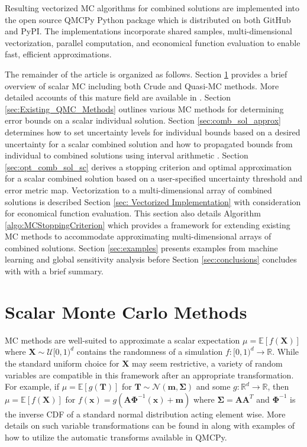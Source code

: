 \documentclass[graybox]{svmult}
\begin{document}
Resulting vectorized MC algorithms for combined solutions are implemented into the open source QMCPy Python package \cite{QMCPy} which is distributed on both GitHub and PyPI. The implementations incorporate shared samples, multi-dimensional vectorization, parallel computation, and economical function evaluation to enable fast, efficient approximations.

The remainder of the article is organized as follows. Section \ref{sec:MCM} provides a brief overview of scalar MC including both Crude and Quasi-MC methods. More detailed accounts of this mature field are available in \cite{niederreiter1992random,mcbook}. Section \ref{sec:Existing_QMC_Methods} outlines various MC methods for determining error bounds on a scalar individual solution. Section \ref{sec:comb_sol_approx} determines how to set uncertainty levels for individual bounds based on a desired uncertainty for a scalar combined solution and how to propagated bounds from individual to combined solutions using interval arithmetic \cite{interval_analysis}. Section \ref{sec:opt_comb_sol_sc} derives a stopping criterion and optimal approximation for a scalar combined solution based on a user-specified uncertainty threshold and error metric map. Vectorization to a multi-dimensional array of combined solutions is described Section \ref{sec: Vectorized Implementation} with consideration for economical function evaluation. This section also details Algorithm \ref{algo:MCStoppingCriterion} which provides a framework for extending existing MC methods to accommodate approximating multi-dimensional arrays of combined solutions. Section \ref{sec:examples} presents examples from machine learning and global sensitivity analysis before Section \ref{sec:conclusions} concludes with with a brief summary.   

\section{Scalar Monte Carlo Methods} \label{sec:MCM}

MC methods are well-suited to approximate a scalar expectation $\mu = \mathbb{E}[f(\boldsymbol{X})]$ where $\boldsymbol{X} \sim \mathcal{U}[0,1)^d$ contains the randomness of a simulation $f: [0,1)^{d} \to \mathbb{R}$. While the standard uniform choice for $\boldsymbol{X}$ may seem restrictive, a variety of random variables are compatible in this framework after an appropriate transformation. For example, if $\mu = \mathbb{E}[g(\boldsymbol{T})]$ for $\boldsymbol{T} \sim \mathcal{N}(\boldsymbol{m},\boldsymbol{\Sigma})$ and some $g: \mathbb{R}^{d} \to \mathbb{R}$, then $\mu = \mathbb{E}[f(\boldsymbol{X})]$ for  $f(\boldsymbol{x})=g(\boldsymbol{A}\boldsymbol{\Phi}^{-1}(\boldsymbol{x})+\boldsymbol{m})$ where $\boldsymbol{\Sigma}=\boldsymbol{A}\boldsymbol{A}^T$ and $\boldsymbol{\Phi}^{-1}$ is the inverse CDF of a standard normal distribution acting element wise. More details on such variable transformations can be found in \cite{QMCSoftware} along with examples of how to utilize the automatic transforms available in QMCPy.
\end{document}
